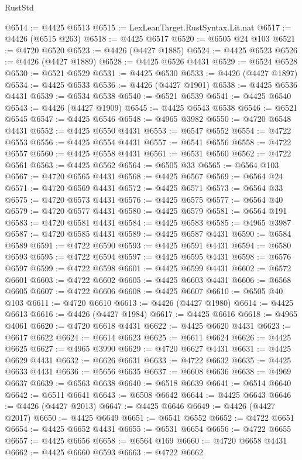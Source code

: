 \begin{lexlean}{RustStd}
\begin{coremodule}
@6514 := @4425 @6513
@6515 := LexLeanTarget.RustSyntax.Lit.nat
@6517 := @4426 (@6515 @263)
@6518 := @4425 @6517
@6520 := @6505 @24 @103
@6521 := @4720 @6520
@6523 := @4426 (@4427 @1885)
@6524 := @4425 @6523
@6526 := @4426 (@4427 @1889)
@6528 := @4425 @6526 @4431
@6529 := @6524 @6528
@6530 := @6521 @6529
@6531 := @4425 @6530
@6533 := @4426 (@4427 @1897)
@6534 := @4425 @6533
@6536 := @4426 (@4427 @1901)
@6538 := @4425 @6536 @4431
@6539 := @6534 @6538
@6540 := @6521 @6539
@6541 := @4425 @6540
@6543 := @4426 (@4427 @1909)
@6545 := @4425 @6543 @6538
@6546 := @6521 @6545
@6547 := @4425 @6546
@6548 := @4965 @3982
@6550 := @4720 @6548 @4431
@6552 := @4425 @6550 @4431
@6553 := @6547 @6552
@6554 := @4722 @6553
@6556 := @4425 @6554 @4431
@6557 := @6541 @6556
@6558 := @4722 @6557
@6560 := @4425 @6558 @4431
@6561 := @6531 @6560
@6562 := @4722 @6561
@6563 := @4425 @6562
@6564 := @6505 @33
@6565 := @6564 @103
@6567 := @4720 @6565 @4431
@6568 := @4425 @6567
@6569 := @6564 @24
@6571 := @4720 @6569 @4431
@6572 := @4425 @6571
@6573 := @6564 @33
@6575 := @4720 @6573 @4431
@6576 := @4425 @6575
@6577 := @6564 @40
@6579 := @4720 @6577 @4431
@6580 := @4425 @6579
@6581 := @6564 @191
@6583 := @4720 @6581 @4431
@6584 := @4425 @6583
@6585 := @4965 @3987
@6587 := @4720 @6585 @4431
@6589 := @4425 @6587 @4431
@6590 := @6584 @6589
@6591 := @4722 @6590
@6593 := @4425 @6591 @4431
@6594 := @6580 @6593
@6595 := @4722 @6594
@6597 := @4425 @6595 @4431
@6598 := @6576 @6597
@6599 := @4722 @6598
@6601 := @4425 @6599 @4431
@6602 := @6572 @6601
@6603 := @4722 @6602
@6605 := @4425 @6603 @4431
@6606 := @6568 @6605
@6607 := @4722 @6606
@6608 := @4425 @6607
@6610 := @6505 @40 @103
@6611 := @4720 @6610
@6613 := @4426 (@4427 @1980)
@6614 := @4425 @6613
@6616 := @4426 (@4427 @1984)
@6617 := @4425 @6616
@6618 := @4965 @4061
@6620 := @4720 @6618 @4431
@6622 := @4425 @6620 @4431
@6623 := @6617 @6622
@6624 := @6614 @6623
@6625 := @6611 @6624
@6626 := @4425 @6625
@6627 := @4965 @3990
@6629 := @4720 @6627 @4431
@6631 := @4425 @6629 @4431
@6632 := @6626 @6631
@6633 := @4722 @6632
@6635 := @4425 @6633 @4431
@6636 := @5656 @6635
@6637 := @6608 @6636
@6638 := @4969 @6637
@6639 := @6563 @6638
@6640 := @6518 @6639
@6641 := @6514 @6640
@6642 := @6511 @6641
@6643 := @6508 @6642
@6644 := @4425 @6643
@6646 := @4426 (@4427 @2013)
@6647 := @4425 @6646
@6649 := @4426 (@4427 @2017)
@6650 := @4425 @6649
@6651 := @6541 @6552
@6652 := @4722 @6651
@6654 := @4425 @6652 @4431
@6655 := @6531 @6654
@6656 := @4722 @6655
@6657 := @4425 @6656
@6658 := @6564 @169
@6660 := @4720 @6658 @4431
@6662 := @4425 @6660 @6593
@6663 := @4722 @6662

\end{coremodule}
\end{lexlean}
